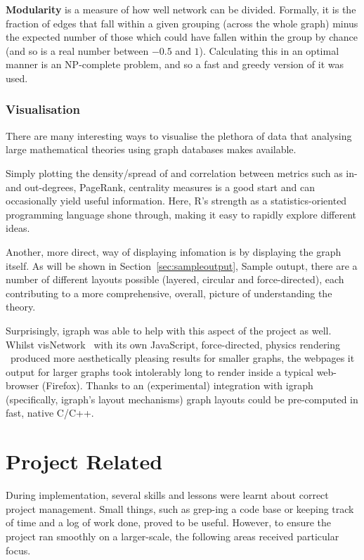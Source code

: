 \textbf{Modularity} is a measure of how well network can be divided.
Formally, it is the fraction of edges that fall within a given grouping
(across the whole graph) minus the expected number of those which could have
fallen within the group by chance (and so is a real number between $-0.5$ and
$1$). Calculating this in an optimal manner is an NP-complete problem, and so
a fast and greedy version of it was used.~\cite{clauset2004}

\subsubsection{Visualisation}

There are many interesting ways to visualise the plethora of data that
analysing large mathematical theories using graph databases makes available.

Simply plotting the density/spread of and correlation between metrics such as
in- and out-degrees, PageRank, centrality measures is a good start and can
occasionally yield useful information. Here, R's strength as a
statistics-oriented programming language shone through, making it easy to
rapidly explore different ideas.

Another, more direct, way of displaying infomation is by displaying the graph
itself. As will be shown in Section~\ref{sec:sampleoutput}, Sample outupt, there
are a number of different layouts possible (layered, circular and
force-directed), each contributing to a more comprehensive, overall, picture of
understanding the theory.

Surprisingly, igraph was able to help with this aspect of the project as well.
Whilst visNetwork \textendash~with its own JavaScript, force-directed, physics
rendering \textendash~produced more aesthetically pleasing results for smaller
graphs, the webpages it output for larger graphs took intolerably long to render
inside a typical web-browser (Firefox). Thanks to an (experimental) integration
with igraph (specifically, igraph's layout mechanisms) graph layouts could be
pre-computed in fast, native C/C++.

\section{Project Related}

During implementation, several skills and lessons were learnt about correct
project management. Small things, such as grep-ing a code base or keeping track of
time and a log of work done, proved to be useful. However, to ensure the
project ran smoothly on a larger-scale, the following areas received particular
focus.


